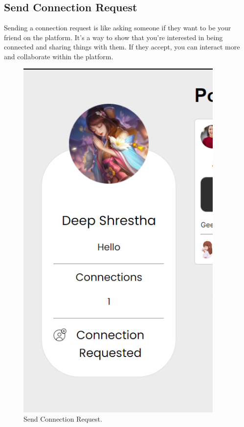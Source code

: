 \subsection{Send Connection Request}
Sending a connection request is like asking someone if they want to be your friend on the platform. It's a way to show that you're interested in being connected and sharing things with them. If they accept, you can interact more and collaborate within the platform.
\begin{figure}[H]
    \centering
    \includegraphics[height=0.3\textheight]{Outcome-ss/connection-request.png}
    \caption{Send Connection Request.}
    \label{fig:Send Connection Request}
\end{figure}
